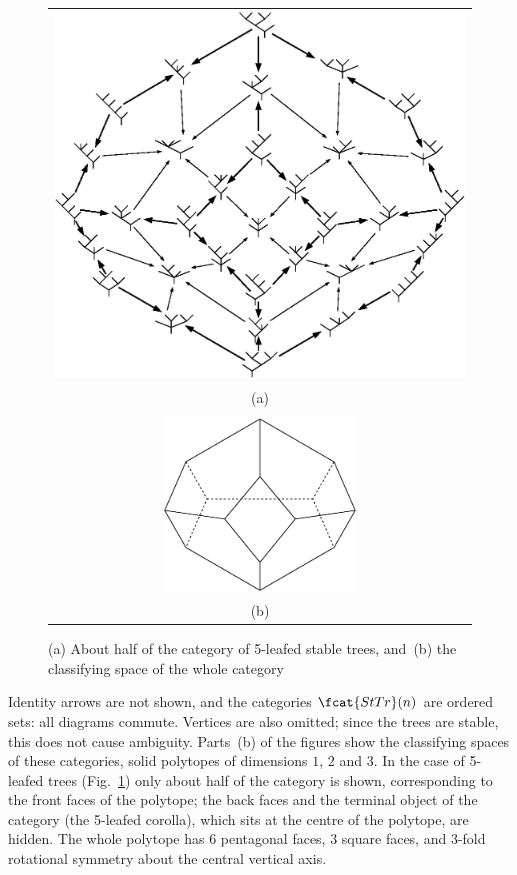 \begin{figure}
\centering
\begin{tabular}{c}
\includegraphics[width=5in]{stable5cat.eps} \\
(a)\\
\\
\includegraphics[width=2in]{stable5space.eps} \\
(b)
\end{tabular}
\caption{(a) About half of the category of 5-leafed stable trees, and~(b)
the classifying space of the whole category}%
%
%
\label{fig:stable-five}
\end{figure}
%
Identity arrows are not shown, and the categories $\fcat{StTr}(n)$ are
ordered sets: all diagrams commute.  Vertices are also omitted; since the
trees are stable, this does not cause ambiguity.  Parts~(b) of the figures
show the classifying spaces of these categories, solid polytopes of
dimensions $1$, $2$ and $3$.  In the case of 5-leafed trees
(Fig.~\ref{fig:stable-five}) only about half of the category is shown,
corresponding to the front faces of the polytope; the back faces and the
terminal object of the category (the 5-leafed corolla), which sits at the
centre of the polytope, are hidden.  The whole polytope has 6 pentagonal
faces, 3 square faces, and 3-fold rotational symmetry about the central
vertical axis.

